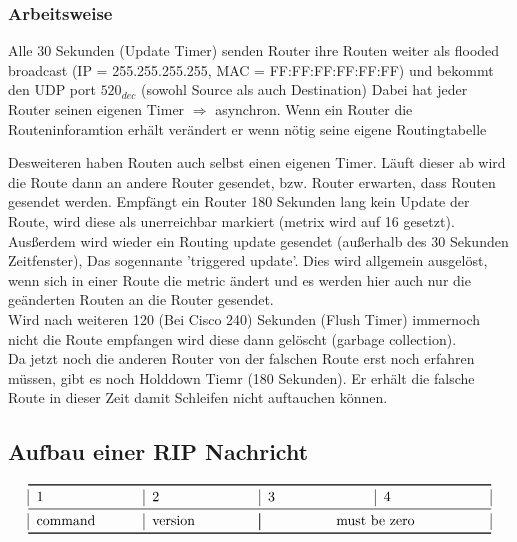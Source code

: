 \documentclass[a4paper,10pt]{scrartcl}
\begin{document}
                \subsubsection{Arbeitsweise}
                    \begin{description}
                        \item Alle 30 Sekunden (Update Timer) senden Router ihre Routen weiter als flooded broadcast (IP = 255.255.255.255, MAC = FF:FF:FF:FF:FF:FF) und bekommt den UDP port $520_{dec}$ (sowohl Source als auch Destination)
                        Dabei hat jeder Router seinen eigenen Timer $\Rightarrow$ asynchron. Wenn ein Router die Routeninforamtion erhält verändert er wenn nötig seine eigene Routingtabelle
                    \end{description}
                    Desweiteren haben Routen auch selbst einen eigenen Timer. Läuft dieser ab wird die Route dann an andere Router gesendet, bzw. Router erwarten, dass Routen gesendet werden.
                    Empfängt ein Router 180 Sekunden lang kein Update der Route, wird diese als unerreichbar markiert (metrix wird auf 16 gesetzt). Ausßerdem wird wieder ein Routing update gesendet 
                    (außerhalb des 30 Sekunden Zeitfenster), Das sogennante 'triggered update'. Dies wird allgemein ausgelöst, wenn sich in einer Route die 
                    metric ändert und es werden hier auch nur die geänderten Routen an die Router gesendet.\\
                    Wird nach weiteren 120 (Bei Cisco 240) Sekunden (Flush Timer) immernoch nicht die Route empfangen wird diese dann gelöscht (garbage collection). \\
                    Da jetzt noch die anderen Router von der falschen Route erst noch erfahren müssen, gibt es noch Holddown Tiemr (180 Sekunden). Er erhält die falsche Route in dieser Zeit
                    damit Schleifen nicht auftauchen können.
                
                \subsection{Aufbau einer RIP Nachricht}
                    \[
                    \begin{tabular}{|p{2.5cm}|p{2.5cm}|p{2.5cm}|p{2.5cm}|}
                        \toprule 
                        1 & 2 & 3 & 4  \\
                        \midrule
                        command & version & \multicolumn{2}{|c|}{must be zero} \\
                        \bottomrule
                    \end{tabular}
                    \]
\end{document}

